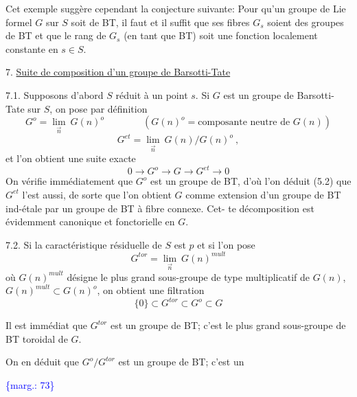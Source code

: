 \documentclass[11pt]{article}
\newcommand{\scanpage}[1]{\par\bigskip\noindent{\small\sffamily[scan #1]}\par}
\newcommand{\mspage}[1]{{\small\sffamily[p.\,#1]}}
\newcommand{\hand}[1]{\textcolor{blue}{#1}}
\newcommand{\margin}[1]{\textcolor{blue}{\{\textsf{marg.:} #1\}}}
\newcommand{\uline}[1]{\underline{#1}}
\newcommand{\unsure}[1]{[#1?]}
\begin{document}
Cet exemple suggère cependant la conjecture suivante: Pour
qu'un groupe de Lie formel $G$ sur $S$ soit de BT, il faut et il suffit
que ses fibres $G_s$ soient des groupes de BT et que le rang de $G_s$
(en tant que BT) soit une fonction localement constante en $s \in S$.

\mspage{\hand{72}}

\clearpage
\scanpage{129/73}
\mspage{\hand{III - 18}}

7. \uline{Suite de composition d'un groupe de Barsotti-Tate}

7.1. Supposons d'abord $S$ réduit à un point $s$. Si $G$ est un
groupe de Barsotti-Tate sur $S$, on pose par définition
\[ G^{o} = \underset{\vec{n}}{\lim}\ G(n)^{o} \qquad\qquad (G(n)^{o} = \text{composante neutre de } G(n)) \]
\[ G^{et} = \underset{\vec{n}}{\lim}\ G(n)/G(n)^{o} \ , \]
et l'on obtient une suite exacte
\[ 0 \to G^{o} \to G \to G^{et} \to 0 \]
On vérifie immédiatement que $G^{o}$ est un groupe de BT, d'où l'on déduit
(5.2) que $G^{et}$ l'est aussi, de sorte que l'on obtient $G$ comme extension
d'un groupe de BT ind-étale par un groupe de BT à fibre connexe. Cet-%
te décomposition est évidemment canonique et fonctorielle en $G$.

7.2. Si la caractéristique résiduelle de $S$ est $p$ et si l'on pose
\[ G^{tor} = \underset{\vec{n}}{\lim}\ G(n)^{mult} \]
où $G(n)^{mult}$ désigne le plus grand sous-groupe de type multiplicatif de
$G(n)$, $G(n)^{mult} \subset G(n)^{o}$, on obtient une filtration
\[ \{0\} \subset G^{tor} \subset G^{o} \subset G \]

Il est immédiat que $G^{tor}$ est un groupe de BT; c'est le plus
grand sous-groupe de BT toroidal de $G$.

On en déduit que $G^{o}/G^{tor}$ est un groupe de BT; c'est un

\margin{73}

\clearpage
\scanpage{129/74}
\mspage{\hand{\unsure{III-17|III-19}}}
\end{document}
